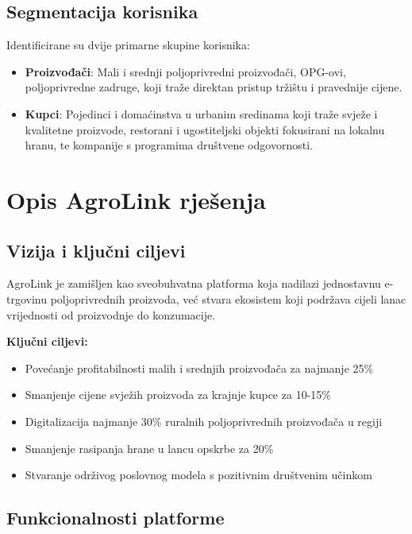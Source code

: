 \documentclass[a4paper,12pt]{article}
\begin{document}
\subsection{Segmentacija korisnika}

Identificirane su dvije primarne skupine korisnika:

\begin{itemize}
    \item \textbf{Proizvođači}: Mali i srednji poljoprivredni proizvođači, OPG-ovi, poljoprivredne zadruge, koji traže direktan pristup tržištu i pravednije cijene.
    \item \textbf{Kupci}: Pojedinci i domaćinstva u urbanim sredinama koji traže svježe i kvalitetne proizvode, restorani i ugostiteljski objekti fokusirani na lokalnu hranu, te kompanije s programima društvene odgovornosti.
\end{itemize}

\section{Opis AgroLink rješenja}
\label{sec:opis-rjesenja}

\subsection{Vizija i ključni ciljevi}

AgroLink je zamišljen kao sveobuhvatna platforma koja nadilazi jednostavnu e-trgovinu poljoprivrednih proizvoda, već stvara ekosistem koji podržava cijeli lanac vrijednosti od proizvodnje do konzumacije.

\textbf{Ključni ciljevi:}
\begin{itemize}
    \item Povećanje profitabilnosti malih i srednjih proizvođača za najmanje 25\%
    \item Smanjenje cijene svježih proizvoda za krajnje kupce za 10-15\%
    \item Digitalizacija najmanje 30\% ruralnih poljoprivrednih proizvođača u regiji
    \item Smanjenje rasipanja hrane u lancu opskrbe za 20\%
    \item Stvaranje održivog poslovnog modela s pozitivnim društvenim učinkom
\end{itemize}

\subsection{Funkcionalnosti platforme}
\end{document}
